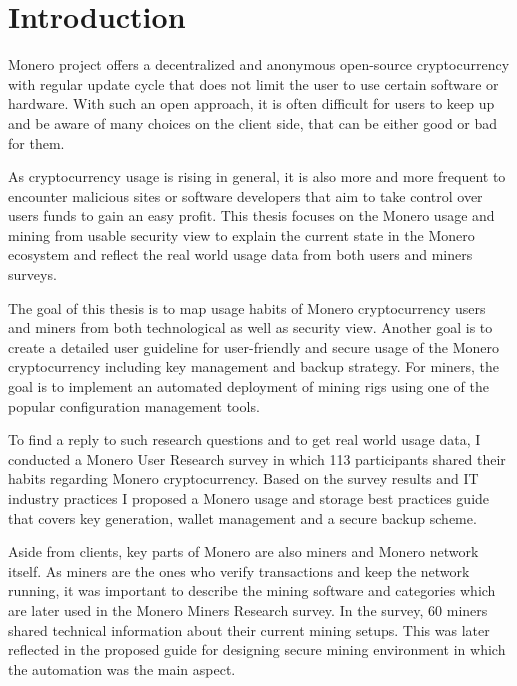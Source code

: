 \documentclass[
  printed, %
  table,   %
  lof,     %
  lot,     %
           oneside, color
]{fithesis3}
\begin{document}
\chapter{Introduction}
Monero project offers a decentralized and anonymous open-source cryptocurrency with regular update cycle that does not limit the user to use certain software or hardware. With such an open approach, it is often difficult for users to keep up and be aware of many choices on the client side, that can be either good or bad for them. %

As cryptocurrency usage is rising in general, it is also more and more frequent to encounter malicious sites or software developers that aim to take control over users funds to gain an easy profit. This thesis focuses on the Monero usage and mining from usable security view to explain the current state in the Monero ecosystem and reflect the real world usage data from both users and miners surveys. %


The goal of this thesis is to map usage habits of Monero cryptocurrency users and miners from both technological as well as security view. Another goal is to create a detailed user guideline for user-friendly and secure usage of the Monero cryptocurrency including key management and backup strategy. For miners, the goal is to implement an automated deployment of mining rigs using one of the popular configuration management tools.

To find a reply to such research questions and to get real world usage data, I conducted a Monero User Research survey in which 113 participants shared their habits regarding Monero cryptocurrency. Based on the survey results and IT industry practices I proposed a Monero usage and storage best practices guide that covers key generation, wallet management and a secure backup scheme.

Aside from clients, key parts of Monero are also miners and Monero network itself. As miners are the ones who verify transactions and keep the network running, it was important to describe the mining software and categories which are later used in the Monero Miners Research survey. In the survey, 60 miners shared technical information about their current mining setups. This was later reflected in the proposed guide for designing secure mining environment in which the automation was the main aspect.
\end{document}
